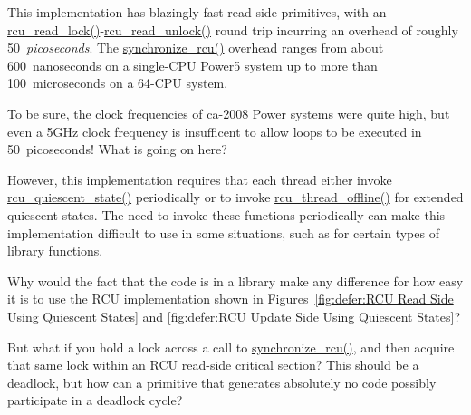 This implementation has blazingly fast read-side primitives, with
an \url{rcu_read_lock()}-\url{rcu_read_unlock()} round trip incurring
an overhead of roughly 50~\emph{picoseconds}.
The \url{synchronize_rcu()} overhead ranges from about 600~nanoseconds
on a single-CPU Power5 system up to more than 100~microseconds on
a 64-CPU system.

\QuickQuiz{}
	To be sure, the clock frequencies of ca-2008 Power
	systems were quite high, but even a 5GHz clock
	frequency is insufficent to allow
	loops to be executed in 50~picoseconds!
	What is going on here?
 \QuickQuizEnd

However, this implementation requires that each thread either
invoke \url{rcu_quiescent_state()} periodically or to invoke
\url{rcu_thread_offline()} for extended quiescent states.
The need to invoke these functions periodically can make this
implementation difficult to use in some situations, such as for
certain types of library functions.

\QuickQuiz{}
	Why would the fact that the code is in a library make
	any difference for how easy it is to use the RCU
	implementation shown in
	Figures~\ref{fig:defer:RCU Read Side Using Quiescent States} and
	\ref{fig:defer:RCU Update Side Using Quiescent States}?
 \QuickQuizEnd

\QuickQuiz{}
	But what if you hold a lock across a call to
	\url{synchronize_rcu()}, and then acquire that same lock within
	an RCU read-side critical section?
	This should be a deadlock, but how can a primitive that
	generates absolutely no code possibly participate in a
	deadlock cycle?
 \QuickQuizEnd

